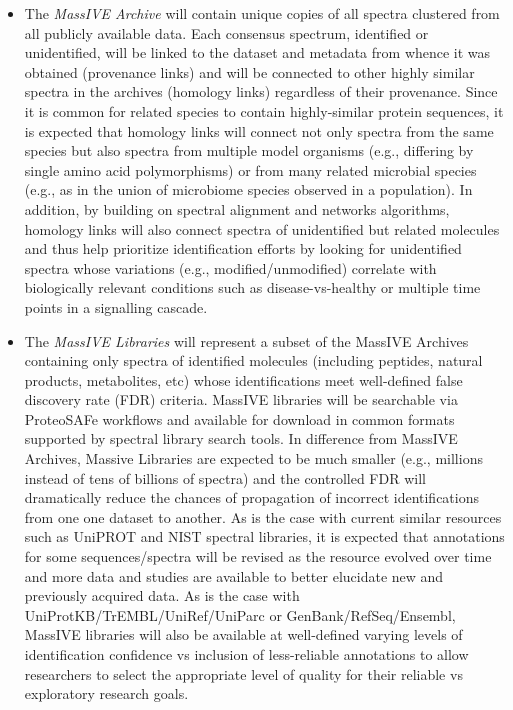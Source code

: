 \documentclass[arial,11pt]{article}
\begin{document}
\begin{itemize}
\item The {\em MassIVE Archive} will contain unique copies of all spectra clustered from all publicly available data. Each consensus spectrum, identified or unidentified, will be linked to the dataset and metadata from whence it was obtained (provenance links) and will be connected to other highly similar spectra in the archives (homology links) regardless of their provenance. Since it is common for related species to contain highly-similar protein sequences, it is expected that homology links will connect not only spectra from the same species but also spectra from multiple model organisms (e.g., differing by single amino acid polymorphisms) or from many related microbial species (e.g., as in the union of microbiome species observed in a population). In addition, by building on spectral alignment and networks algorithms, homology links will also connect spectra of unidentified but related molecules and thus help prioritize identification efforts by looking for unidentified spectra whose variations (e.g., modified/unmodified) correlate with biologically relevant conditions such as disease-vs-healthy or multiple time points in a signalling cascade.

\item The {\em MassIVE Libraries} will represent a subset of the MassIVE Archives containing only spectra of identified molecules (including peptides, natural products, metabolites, etc) whose identifications meet well-defined false discovery rate (FDR) criteria. MassIVE libraries will be searchable via ProteoSAFe workflows and available for download in common formats supported by spectral library search tools. In difference from MassIVE Archives, Massive Libraries are expected to be much smaller (e.g., millions instead of tens of billions of spectra) and the controlled FDR will dramatically reduce the chances of propagation of incorrect identifications from one one dataset to another. As is the case with current similar resources such as UniPROT and NIST spectral libraries, it is expected that annotations for some sequences/spectra will be revised as the resource evolved over time and more data and studies are available to better elucidate new and previously acquired data. As is the case with UniProtKB/TrEMBL/UniRef/UniParc or GenBank/RefSeq/Ensembl, MassIVE libraries will also be available at well-defined varying levels of identification confidence vs inclusion of less-reliable annotations to allow researchers to select the appropriate level of quality for their reliable vs exploratory research goals.


\end{itemize}
\end{document}
